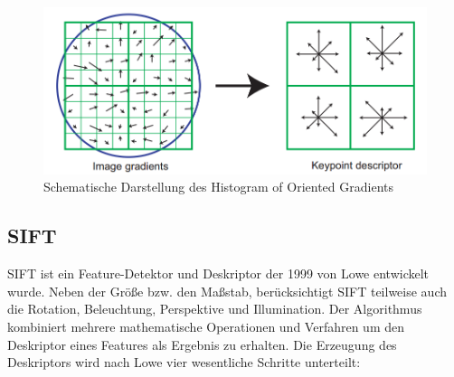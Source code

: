\begin{figure}
	\centering
	\includegraphics[scale=0.5]{images/hog.png}
	\caption{Schematische Darstellung des Histogram of Oriented Gradients  \cite{dif2004}}
	\label{img:hog}
\end{figure}

\subsection{SIFT}

SIFT ist ein Feature-Detektor und Deskriptor der 1999 von Lowe \cite{dif2004} entwickelt wurde. Neben der Größe bzw. den Maßstab, berücksichtigt SIFT teilweise auch die Rotation, Beleuchtung, Perspektive und Illumination. Der Algorithmus kombiniert mehrere mathematische Operationen und Verfahren um den Deskriptor eines Features als Ergebnis zu erhalten. Die Erzeugung des Deskriptors wird nach Lowe vier wesentliche Schritte unterteilt:

